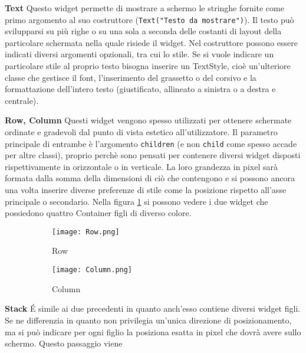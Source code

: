 	\begin{trivlist}
		\item \textbf{Text} \newline
		Questo widget permette di mostrare a schermo le stringhe fornite come
		primo argomento al suo costruttore (\verb|Text("Testo da mostrare")|).
		Il testo può svilupparsi su più righe o su una sola a seconda delle
		costanti di layout della particolare schermata nella quale risiede il
		widget. Nel costruttore possono essere indicati diversi argomenti
		opzionali, tra cui lo stile. Se si vuole indicare un particolare stile
		al proprio testo bisogna inserire un TextStyle, cioè un'ulteriore classe
		che gestisce il font, l'inserimento del grassetto o del corsivo e la
		formattazione dell'intero testo (giustificato, allineato a sinistra o a
		destra e centrale).  
		\item \textbf{Row, Column} \newline
		Questi widget vengono spesso utilizzati per ottenere schermate ordinate
		e gradevoli dal punto di vista estetico all'utilizzatore. Il parametro
		principale di entrambe è l'argomento \verb|children| (e non \verb|child| come
		spesso accade per altre classi), proprio perchè sono pensati per
		contenere diversi widget disposti rispettivamente in orizzontale o in
		verticale. La loro grandezza in pixel sarà formata dalla somma della
		dimensioni di ciò che contengono e si possono ancora una volta inserire diverse
		preferenze di stile come la posizione rispetto all'asse principale o
		secondario. Nella figura \ref{rowColumn} si possono vedere i due widget
		che possiedono quattro Container figli di diverso colore.
		\begin{figure}[h!]
			\centering
			\begin{subfigure}{0.3\linewidth}
				\texttt{[image: Row.png]}
				\caption{Row}
			\end{subfigure}
			\begin{subfigure}{0.3\linewidth}
				\texttt{[image: Column.png]}
				\caption{Column}
			\end{subfigure}
			\caption{}
			\label{rowColumn}
		\end{figure} 
		\item \textbf{Stack} \newline
		\'E simile ai due precedenti in quanto anch'esso contiene diversi widget
		figli. Se ne differenzia in quanto non privilegia un'unica direzione di
		posizionamento, ma si può indicare per ogni figlio la posiziona esatta
		in pixel che dovrà avere sullo schermo. Questo passaggio viene

\end{trivlist}
